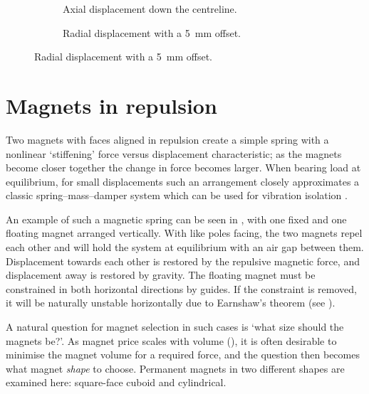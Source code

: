 \documentclass[11pt,a4paper]{memoir}
\begin{document}
\begin{figure}
\begin{wide}
\begin{subfigure}
\caption{Axial displacement down the centreline.}
\end{subfigure}\hfil
\begin{subfigure}
\caption{Radial displacement with a \SI{5}{mm} offset.}
\end{subfigure}
\end{wide}
\end{figure}

\section{Magnets in repulsion}

Two magnets with faces aligned in repulsion create a simple spring with a nonlinear `stiffening' force versus displacement characteristic; as the magnets become closer together the change in force becomes larger.
When bearing load at equilibrium, for small displacements such an arrangement closely approximates a classic spring--mass--damper system which can be used for vibration isolation \parencite{puppin2002}.

An example of such a magnetic spring can be seen in , with one fixed and one floating magnet arranged vertically.
With like poles facing, the two magnets repel each other and will hold the system at equilibrium with an air gap between them.
Displacement towards each other is restored by the repulsive magnetic force, and displacement away is restored by gravity.
The floating magnet must be constrained in both horizontal directions by guides.
If the constraint is removed, it will be naturally unstable horizontally due to Earnshaw's theorem (see ).

A natural question for magnet selection in such cases is `what size should the magnets be?'.
As magnet price scales with volume (), it is often desirable to minimise the magnet volume for a required force, and the question then becomes what magnet \emph{shape} to choose.
Permanent magnets in two different shapes are examined here: square-face cuboid and cylindrical.
\end{document}

